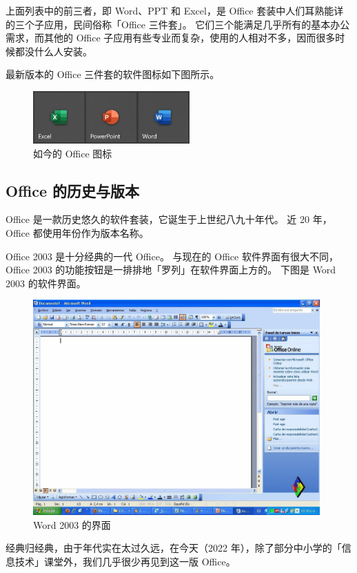 上面列表中的前三者，即 Word、PPT 和 Excel，是 Office 套装中人们耳熟能详的三个子应用，民间俗称「Office 三件套」。
它们三个能满足几乎所有的基本办公需求，而其他的 Office 子应用有些专业而复杂，使用的人相对不多，因而很多时候都没什么人安装。

最新版本的 Office 三件套的软件图标如下图所示。

\begin{figure}[htb!]
  \centering
  \includegraphics[width=6cm]{assets/Office_Icons.jpg}
  \caption{如今的 Office 图标}
  \label{Office_Icons}
\end{figure}

\subsection{Office 的历史与版本}

Office 是一款历史悠久的软件套装，它诞生于上世纪八九十年代。
近 20 年，Office 都使用年份作为版本名称。

Office 2003 是十分经典的一代 Office。
与现在的 Office 软件界面有很大不同，Office 2003 的功能按钮是一排排地「罗列」在软件界面上方的。
下图是 Word 2003 的软件界面。

\begin{figure}[htb!]
  \centering
  \includegraphics[width=11cm]{assets/Word_2003.jpg}
  \caption{Word 2003 的界面}
  \label{Word_2003}
\end{figure}

经典归经典，由于年代实在太过久远，在今天（2022 年），除了部分中小学的「信息技术」课堂外，我们几乎很少再见到这一版 Office。

